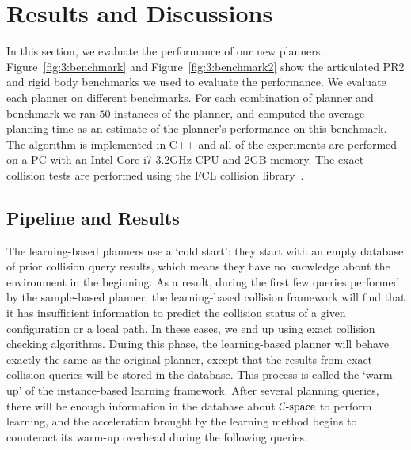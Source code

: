 


\section{Results and Discussions}
\label{sec:3:results}
In this section, we evaluate the performance of our new planners. Figure~\ref{fig:3:benchmark} and Figure~\ref{fig:3:benchmark2} show the articulated PR2 and rigid body benchmarks we used to evaluate the performance. We evaluate each planner on different benchmarks. For each combination of planner and benchmark we ran $50$ instances of the planner, and computed the average planning time as an estimate of the planner's performance on this benchmark. The algorithm is implemented in C++ and all of the experiments are performed on a PC with an Intel Core i7 3.2GHz CPU and 2GB memory. The exact collision tests are performed using the FCL collision library~\cite{Pan:ICRA:2012}.

\subsection{Pipeline and Results}

The learning-based planners use a `cold start': they start with an empty database of prior collision query results, which means they have no knowledge about the environment in the beginning. As a result, during the first few queries performed by the sample-based planner, the learning-based collision framework will find that it has insufficient information to predict the collision status of a given configuration or a local path. In these cases, we end up using exact collision checking algorithms. During this phase, the learning-based planner will behave exactly the same as the original planner, except that the results from exact collision queries will be stored in the database. This process is called the `warm up' of the instance-based learning framework. After several planning queries, there will be enough information in the database about $\mathcal C\text{-space}$ to perform learning, and the acceleration brought by the learning method begins to counteract its warm-up overhead during the following queries.

